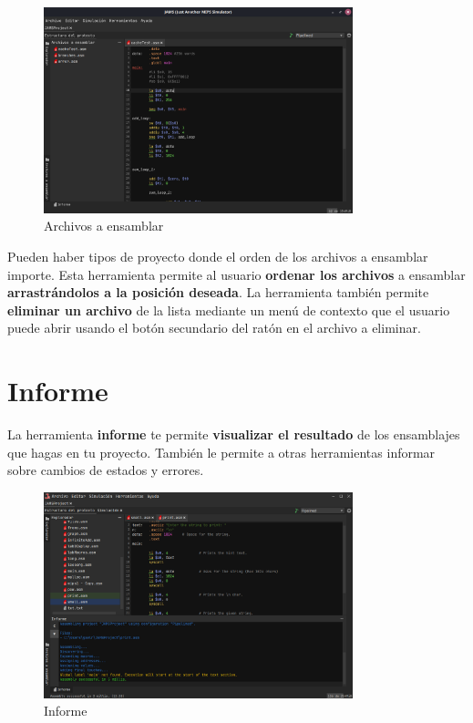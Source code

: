 \begin{figure}[H]
    \centering
    \includegraphics[width=0.8\textwidth]{images/tools/jams-files-to-assemble}
    \caption{Archivos a ensamblar}
    \label{fig:jams-files-to-assemble}
\end{figure}

Pueden haber tipos de proyecto donde el
orden de los archivos a ensamblar importe.
Esta herramienta permite al usuario \textbf{ordenar los archivos}
a ensamblar \textbf{arrastrándolos a la posición deseada}.
La herramienta también permite \textbf{eliminar un archivo} de la lista
mediante un menú de contexto que el usuario puede abrir usando
el botón secundario del ratón en el archivo a eliminar.


\section{Informe}\label{sec:informe}

La herramienta \textbf{informe} te permite \textbf{visualizar el resultado}
de los ensamblajes que hagas en tu proyecto.
También le permite a otras herramientas informar sobre cambios de estados y errores.

\begin{figure}[H]
    \centering
    \includegraphics[width=0.8\textwidth]{images/tools/jams-log}
    \caption{Informe}
    \label{fig:jams-log}
\end{figure}

